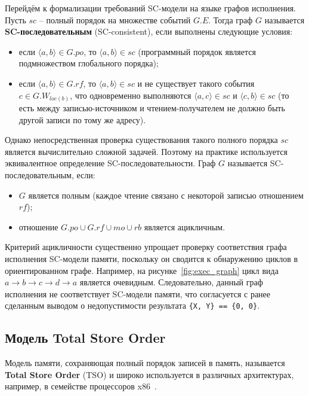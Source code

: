 Перейдём к формализации требований SC-модели на языке графов
исполнения. Пусть $sc$ -- полный порядок на множестве событий $G.E$.
Тогда граф $G$ называется \textbf{SC-последовательным}
(SC-consistent), если выполнены следующие условия:
\begin{itemize}
  \item если $\langle a, b \rangle \in G.po$, то $\langle a, b
    \rangle \in sc$ (программный порядок является подмножеством
    глобального порядка);
  \item если $\langle a, b \rangle \in G.rf$, то $\langle a, b
    \rangle \in sc$ и не существует такого события $c \in
    G.W_{loc(b)}$, что одновременно выполняются $\langle a, c \rangle
    \in sc$ и $\langle c, b \rangle \in sc$ (то есть между
      записью-источником и чтением-получателем не должно быть другой
    записи по тому же адресу).
\end{itemize}

Однако непосредственная проверка существования такого полного порядка
$sc$ является вычислительно сложной задачей. Поэтому на практике
используется эквивалентное определение SC-последовательности. Граф
$G$ называется SC-последовательным, если:
\begin{itemize}
  \item $G$ является полным (каждое чтение связано с некоторой
    записью отношением $rf$);
  \item отношение $G.po \cup G.rf \cup mo \cup rb$ является ацикличным.
\end{itemize}


Критерий ацикличности существенно упрощает проверку соответствия
графа исполнения SC-модели памяти, поскольку он сводится к
обнаружению циклов в ориентированном графе. Например, на
рисунке~\ref{fig:exec_graph} цикл вида $a \rightarrow b \rightarrow c
\rightarrow d \rightarrow a$ является очевидным. Следовательно,
данный граф исполнения не соответствует SC-модели памяти, что
согласуется с ранее сделанным выводом о недопустимости результата
\texttt{\{X, Y\} == \{0, 0\}}.

\subsection{Модель Total Store Order}
\label{sec:tso}

Модель памяти, сохраняющая полный порядок записей в память,
называется \textbf{Total Store Order} (TSO) и широко используется в
различных архитектурах, например, в семействе процессоров x86~\cite{x86tso}.


